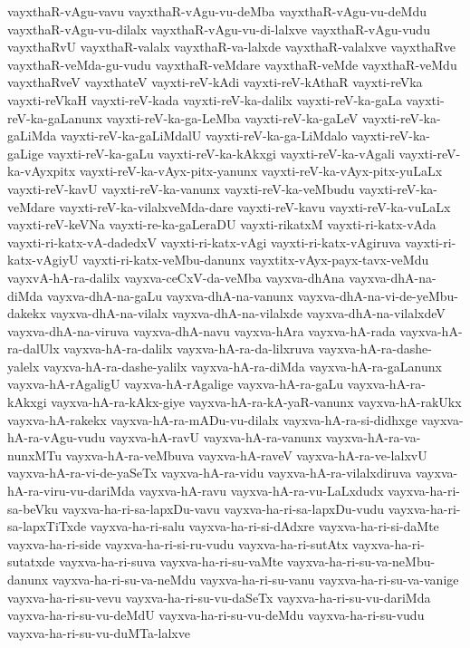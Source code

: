 {vayxthaR-vAgu-vavu
vayxthaR-vAgu-vu-deMba
vayxthaR-vAgu-vu-deMdu
vayxthaR-vAgu-vu-dilalx
vayxthaR-vAgu-vu-di-lalxve
vayxthaR-vAgu-vudu
vayxthaRvU
vayxthaR-valalx
vayxthaR-va-lalxde
vayxthaR-valalxve
vayxthaRve
vayxthaR-veMda-gu-vudu
vayxthaR-veMdare
vayxthaR-veMde
vayxthaR-veMdu
vayxthaRveV
vayxthateV
vayxti-reV-kAdi
vayxti-reV-kAthaR
vayxti-reVka
vayxti-reVkaH
vayxti-reV-kada
vayxti-reV-ka-dalilx
vayxti-reV-ka-gaLa
vayxti-reV-ka-gaLanunx
vayxti-reV-ka-ga-LeMba
vayxti-reV-ka-gaLeV
vayxti-reV-ka-gaLiMda
vayxti-reV-ka-gaLiMdalU
vayxti-reV-ka-ga-LiMdalo
vayxti-reV-ka-gaLige
vayxti-reV-ka-gaLu
vayxti-reV-ka-kAkxgi
vayxti-reV-ka-vAgali
vayxti-reV-ka-vAyxpitx
vayxti-reV-ka-vAyx-pitx-yanunx
vayxti-reV-ka-vAyx-pitx-yuLaLx
vayxti-reV-kavU
vayxti-reV-ka-vanunx
vayxti-reV-ka-veMbudu
vayxti-reV-ka-veMdare
vayxti-reV-ka-vilalxveMda-dare
vayxti-reV-kavu
vayxti-reV-ka-vuLaLx
vayxti-reV-keVNa
vayxti-re-ka-gaLeraDU
vayxti-rikatxM
vayxti-ri-katx-vAda
vayxti-ri-katx-vA-dadedxV
vayxti-ri-katx-vAgi
vayxti-ri-katx-vAgiruva
vayxti-ri-katx-vAgiyU
vayxti-ri-katx-veMbu-danunx
vayxtitx-vAyx-payx-tavx-veMdu
vayxvA-hA-ra-dalilx
vayxva-ceCxV-da-veMba
vayxva-dhAna
vayxva-dhA-na-diMda
vayxva-dhA-na-gaLu
vayxva-dhA-na-vanunx
vayxva-dhA-na-vi-de-yeMbu-dakekx
vayxva-dhA-na-vilalx
vayxva-dhA-na-vilalxde
vayxva-dhA-na-vilalxdeV
vayxva-dhA-na-viruva
vayxva-dhA-navu
vayxva-hAra
vayxva-hA-rada
vayxva-hA-ra-dalUlx
vayxva-hA-ra-dalilx
vayxva-hA-ra-da-lilxruva
vayxva-hA-ra-dashe-yalelx
vayxva-hA-ra-dashe-yalilx
vayxva-hA-ra-diMda
vayxva-hA-ra-gaLanunx
vayxva-hA-rAgaligU
vayxva-hA-rAgalige
vayxva-hA-ra-gaLu
vayxva-hA-ra-kAkxgi
vayxva-hA-ra-kAkx-giye
vayxva-hA-ra-kA-yaR-vanunx
vayxva-hA-rakUkx
vayxva-hA-rakekx
vayxva-hA-ra-mADu-vu-dilalx
vayxva-hA-ra-si-didhxge
vayxva-hA-ra-vAgu-vudu
vayxva-hA-ravU
vayxva-hA-ra-vanunx
vayxva-hA-ra-va-nunxMTu
vayxva-hA-ra-veMbuva
vayxva-hA-raveV
vayxva-hA-ra-ve-lalxvU
vayxva-hA-ra-vi-de-yaSeTx
vayxva-hA-ra-vidu
vayxva-hA-ra-vilalxdiruva
vayxva-hA-ra-viru-vu-dariMda
vayxva-hA-ravu
vayxva-hA-ra-vu-LaLxdudx
vayxva-ha-ri-sa-beVku
vayxva-ha-ri-sa-lapxDu-vavu
vayxva-ha-ri-sa-lapxDu-vudu
vayxva-ha-ri-sa-lapxTiTxde
vayxva-ha-ri-salu
vayxva-ha-ri-si-dAdxre
vayxva-ha-ri-si-daMte
vayxva-ha-ri-side
vayxva-ha-ri-si-ru-vudu
vayxva-ha-ri-sutAtx
vayxva-ha-ri-sutatxde
vayxva-ha-ri-suva
vayxva-ha-ri-su-vaMte
vayxva-ha-ri-su-va-neMbu-danunx
vayxva-ha-ri-su-va-neMdu
vayxva-ha-ri-su-vanu
vayxva-ha-ri-su-va-vanige
vayxva-ha-ri-su-vevu
vayxva-ha-ri-su-vu-daSeTx
vayxva-ha-ri-su-vu-dariMda
vayxva-ha-ri-su-vu-deMdU
vayxva-ha-ri-su-vu-deMdu
vayxva-ha-ri-su-vudu
vayxva-ha-ri-su-vu-duMTa-lalxve
}
